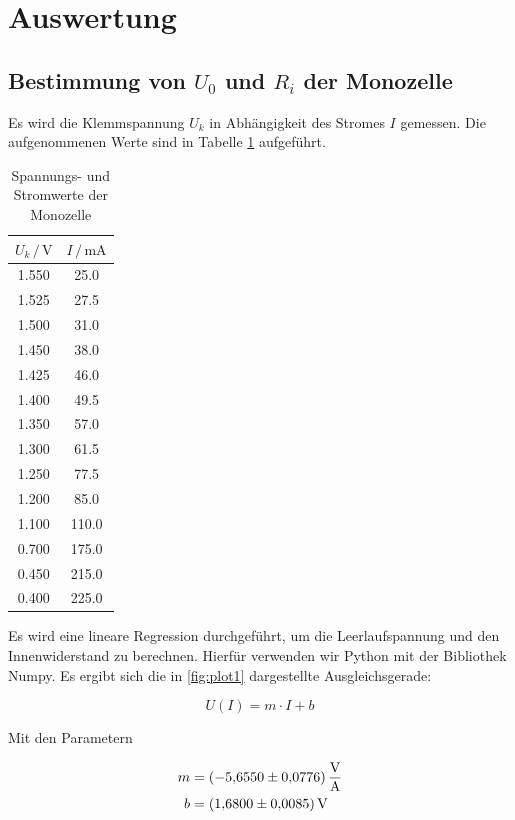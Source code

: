 \section{Auswertung}
\label{sec:Auswertung}

\subsection{Bestimmung von $U_0$ und $R_i$ der Monozelle}

Es wird die Klemmspannung $U_k$ in Abhängigkeit des Stromes $I$ gemessen. 
Die aufgenommenen Werte sind in Tabelle \ref{tab:Monozelle} aufgeführt. 

\begin{table}
\centering
\caption{Spannungs- und Stromwerte der Monozelle}
\label{tab:Monozelle}
\begin{tabular}{c c}
\toprule
$U_k \,/\, \si{\volt}$ & $I \,/\, \si{\milli\ampere}$\\
\midrule
1.550 &  25.0\\
1.525 &  27.5\\
1.500 &  31.0\\
1.450 &  38.0\\
1.425 &  46.0\\
1.400 &  49.5\\
1.350 &  57.0\\
1.300 &  61.5\\
1.250 &  77.5\\
1.200 &  85.0\\
1.100 & 110.0\\
0.700 & 175.0\\
0.450 & 215.0\\
0.400 & 225.0\\
\bottomrule
\end{tabular}
\end{table}

Es wird eine lineare Regression durchgeführt, um die Leerlaufspannung 
und den Innenwiderstand zu berechnen. Hierfür verwenden wir Python mit 
der Bibliothek Numpy.
Es ergibt sich die in \ref{fig:plot1} dargestellte Ausgleichsgerade:

\begin{equation}
U(I) = m\cdot I + b 
\label{eqn:Gerade}
\end{equation}

Mit den Parametern

\begin{align}
m &= \SI{-5.655+-0.0776}{\volt\per\ampere}\\
b &= \SI{1.680+-0.0085}{\volt}
\end{align}

